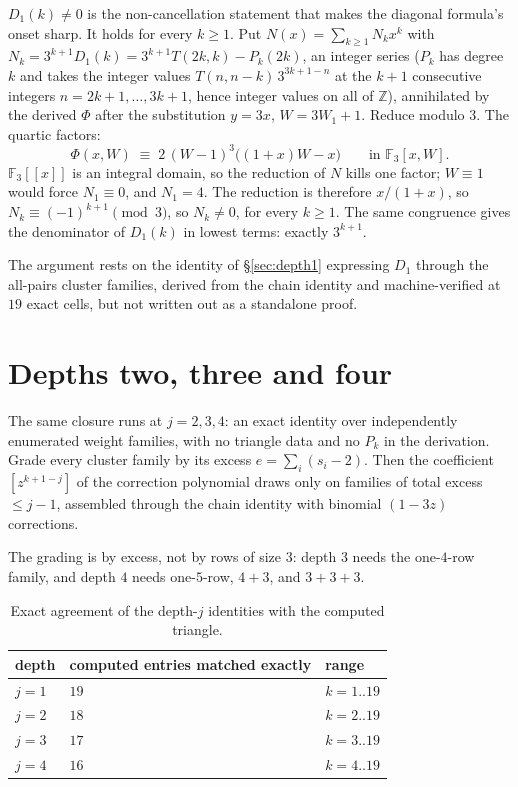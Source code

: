 \documentclass[11pt]{article}
\begin{document}
$D_1(k) \ne 0$ is the non-cancellation statement that makes the diagonal
formula's onset sharp. It holds for every $k \ge 1$. Put $N(x) = \sum_{k \ge 1} N_k x^k$
with $N_k = 3^{k+1}D_1(k) = 3^{k+1}T(2k,k) - P_k(2k)$, an integer series ($P_k$
has degree $k$ and takes the integer values $T(n,n-k)\,3^{3k+1-n}$ at the $k+1$
consecutive integers $n = 2k+1, \dots, 3k+1$, hence integer values on all of
$\mathbb{Z}$), annihilated by the derived $\Phi$ after the substitution $y = 3x$,
$W = 3W_1 + 1$. Reduce modulo $3$. The quartic factors:
\[
  \Phi(x,W) \;\equiv\; 2\,(W-1)^3\bigl((1+x)W - x\bigr)
  \qquad\text{in } \mathbb{F}_3[x,W].
\]
$\mathbb{F}_3[[x]]$ is an integral domain, so the reduction of $N$ kills one
factor; $W \equiv 1$ would force $N_1 \equiv 0$, and $N_1 = 4$. The reduction is
therefore $x/(1+x)$, so $N_k \equiv (-1)^{k+1} \pmod 3$, so $N_k \ne 0$, for
every $k \ge 1$. The same congruence gives the denominator of $D_1(k)$ in
lowest terms: exactly $3^{k+1}$.

The argument rests on the identity of \S\ref{sec:depth1} expressing $D_1$
through the all-pairs cluster families, derived from the chain identity and
machine-verified at $19$ exact cells, but not written out as a standalone
proof.

\section{Depths two, three and four}
\label{sec:depths}

The same closure runs at $j = 2, 3, 4$: an exact identity over independently
enumerated weight families, with no triangle data and no $P_k$ in the
derivation. Grade every cluster family by its excess
$e = \sum_i (s_i - 2)$. Then the coefficient $[z^{k+1-j}]$ of the correction
polynomial draws only on families of total excess $\le j-1$, assembled through
the chain identity with binomial $(1-3z)$ corrections.

The grading is by excess, not by rows of size $3$: depth $3$ needs the
one-$4$-row family, and depth $4$ needs one-$5$-row, $4+3$, and $3+3+3$.

\begin{table}[H]
\centering\small
\begin{tabular}{l l l}
\toprule
depth & computed entries matched exactly & range \\
\midrule
$j = 1$ & $19$ & $k = 1..19$ \\
$j = 2$ & $18$ & $k = 2..19$ \\
$j = 3$ & $17$ & $k = 3..19$ \\
$j = 4$ & $16$ & $k = 4..19$ \\
\bottomrule
\end{tabular}
\caption{Exact agreement of the depth-$j$ identities with the computed
triangle.}
\label{tab:depths}
\end{table}
\end{document}
